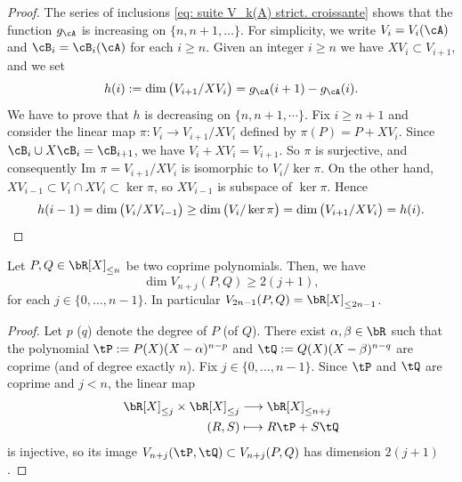 \begin{proof}
The series of inclusions \eqref{eq: suite V_k(A) strict. croissante} shows that the function $g_\cA$ is increasing on $\{n,n+1,\dots\}$. For simplicity, we write $V_i=V_{i}(\cA)$ and $\cB_{i} = \cB_{i}(\cA)$ for each $i \geq n$. Given an integer $i\geq n$ we have $XV_{i}\subset V_{i+1}$, and we set
\[
h(i):= \dim \big(V_{i+1}/XV_{i}\big) = g_\cA(i+1)-g_\cA(i).
\]
We have to prove that $h$ is decreasing on $\{n,n+1,\cdots\}$. Fix $i\geq n+1$ and consider the linear map $\pi : V_i \to V_{i+1}/XV_{i}$ defined by $\pi(P) = P + XV_{i}$. Since $\cB_{i}\cup X\cB_{i} = \cB_{i+1}$, we have $V_i + XV_i = V_{i+1}$. So $\pi$ is surjective, and consequently $\textrm{Im } \pi = V_{i+1}/XV_{i}$ is isomorphic to $V_i / \ker \pi$.
On the other hand, $XV_{i-1}\subset V_{i} \cap XV_{i} \subset \ker\pi$, so $XV_{i-1}$ is subspace of $\ker \pi$. Hence
\begin{equation*}
h(i-1) = \dim \big(V_{i}/XV_{i-1}\big) \geq \dim\big(V_i / \ker \pi \big) = \dim \big(V_{i+1}/XV_{i}\big) = h(i).\qedhere
\end{equation*}
\end{proof}

\begin{Lem}
\label{lem : dim V_n+j(P,Q)}
Let $P,Q \in \bR[X]_{\leq n}$ be two coprime polynomials. Then, we have
\begin{equation*}
\dim V_{n+j}(P,Q) \geq 2(j+1),
\end{equation*}
for each $j\in\{0,\dots,n-1\}$. In particular $V_{2n-1}(P,Q) = \bR[X]_{\leq 2n-1}$.
\end{Lem}

\begin{proof}
Let $p$ (\resp $q$) denote the degree of $P$ (\resp of $Q$). There exist $\alpha,\beta\in\bR$ such that the polynomial $\tP := P(X)(X-\alpha)^{n-p}$ and $\tQ:= Q(X)(X-\beta)^{n-q}$ are coprime (and of degree exactly $n$). Fix $j\in\{0,\dots,n-1\}$. Since $\tP$ and $\tQ$ are coprime and $j<n$, the linear map
\begin{align*}
\bR[X]_{\leq j}\times \bR[X]_{\leq j} & \longrightarrow \bR[X]_{\leq n+j} \\
(R,S) & \longmapsto R\tP + S\tQ
\end{align*}
is injective, so its image $V_{n+j}(\tP,\tQ) \subset V_{n+j}(P,Q)$ has dimension $2(j+1)$.
\end{proof}

